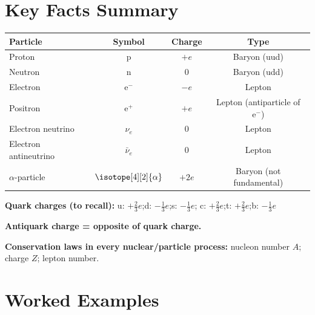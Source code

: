 \section{Key Facts Summary}

\begin{minipage}{\linewidth}
\begin{tcolorbox}[colback=lightgold, colframe=accentgold]
\begin{center}
\renewcommand{\arraystretch}{1.5}
\begin{tabular}{@{} l c c c @{}}
\toprule
\textbf{Particle} & \textbf{Symbol} & \textbf{Charge} & \textbf{Type} \\
\midrule
Proton & p & $+e$ & Baryon (uud) \\
Neutron & n & $0$ & Baryon (udd) \\
Electron & $\mathrm{e}^-$ & $-e$ & Lepton \\
Positron & $\mathrm{e}^+$ & $+e$ & Lepton (antiparticle of $\mathrm{e}^-$) \\
Electron neutrino & $\nu_e$ & $0$ & Lepton \\
Electron antineutrino & $\bar{\nu}_e$ & $0$ & Lepton \\
$\alpha$-particle & $\isotope[4][2]{\alpha}$ & $+2e$ & Baryon (not fundamental) \\
\bottomrule
\end{tabular}
\end{center}
\end{tcolorbox}

\vspace{0.5em}
\begin{tcolorbox}[colback=lightblue, colframe=darkblue]
\textbf{Quark charges (to recall):}
\quad u: $+\tfrac{2}{3}e$;\quad d: $-\tfrac{1}{3}e$;\quad s: $-\tfrac{1}{3}e$;\quad
c: $+\tfrac{2}{3}e$;\quad t: $+\tfrac{2}{3}e$;\quad b: $-\tfrac{1}{3}e$

\vspace{0.4em}
\textbf{Antiquark charge = opposite of quark charge.}

\vspace{0.4em}
\textbf{Conservation laws in every nuclear/particle process:}
nucleon number $A$; charge $Z$; lepton number.
\end{tcolorbox}
\end{minipage}

\section{Worked Examples}

